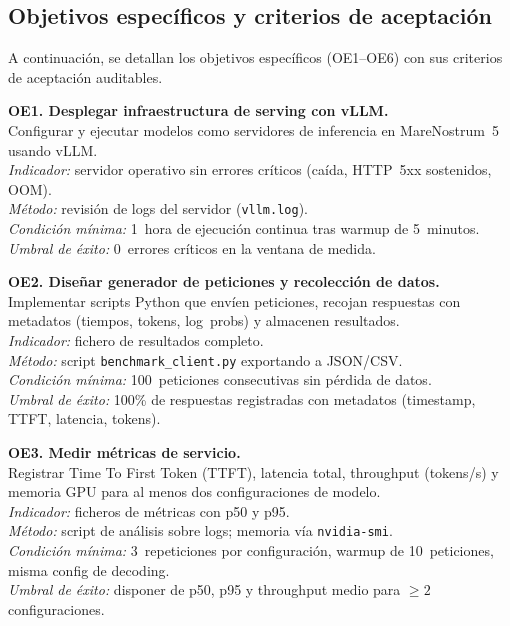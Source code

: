 \documentclass[11pt,a4paper]{article}
\begin{document}
\subsection{Objetivos específicos y criterios de aceptación}
\label{subsec:oe-especificos}

A continuación, se detallan los objetivos específicos (OE1--OE6) con sus criterios de aceptación auditables.

\textbf{OE1. Desplegar infraestructura de serving con vLLM.}\\
Configurar y ejecutar modelos como servidores de inferencia en MareNostrum~5 usando vLLM.\\
\textit{Indicador:} servidor operativo sin errores críticos (caída, HTTP~5xx sostenidos, OOM).\\
\textit{Método:} revisión de logs del servidor (\texttt{vllm.log}).\\
\textit{Condición mínima:} 1~hora de ejecución continua tras warmup de 5~minutos.\\
\textit{Umbral de éxito:} 0~errores críticos en la ventana de medida.

\textbf{OE2. Diseñar generador de peticiones y recolección de datos.}\\
Implementar scripts Python que envíen peticiones, recojan respuestas con metadatos (tiempos, tokens, log~probs) y almacenen resultados.\\
\textit{Indicador:} fichero de resultados completo.\\
\textit{Método:} script \texttt{benchmark\_client.py} exportando a JSON/CSV.\\
\textit{Condición mínima:} 100~peticiones consecutivas sin pérdida de datos.\\
\textit{Umbral de éxito:} 100\% de respuestas registradas con metadatos (timestamp, TTFT, latencia, tokens).

\textbf{OE3. Medir métricas de servicio.}\\
Registrar Time To First Token (TTFT), latencia total, throughput (tokens/s) y memoria GPU para al menos dos configuraciones de modelo.\\
\textit{Indicador:} ficheros de métricas con p50 y p95.\\
\textit{Método:} script de análisis sobre logs; memoria vía \texttt{nvidia-smi}.\\
\textit{Condición mínima:} 3~repeticiones por configuración, warmup de 10~peticiones, misma config de decoding.\\
\textit{Umbral de éxito:} disponer de p50, p95 y throughput medio para $\geq2$ configuraciones.
\end{document}
